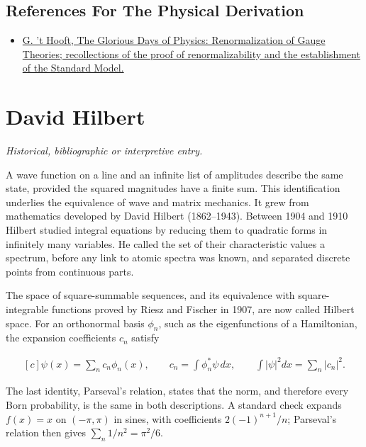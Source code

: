 \documentclass[11pt,oneside]{book}
\newenvironment{centeredalign}{\[\begin{gathered}[c]}{\end{gathered}\]}
\begin{document}
\subsection*{References For The Physical Derivation}
\begin{itemize}
\item \href{https://arxiv.org/abs/hep-th/9812203}{G. 't Hooft, The Glorious Days of Physics: Renormalization of Gauge Theories; recollections of the proof of renormalizability and the establishment of the Standard Model.}
\end{itemize}





\clearpage

\section{David Hilbert}

\label{topic:david-hilbert}

\par\smallskip\noindent\textit{Historical, bibliographic or interpretive entry.}

A wave function on a line and an infinite list of amplitudes describe the same state, provided the squared magnitudes have a finite sum. This identification underlies the equivalence of wave and matrix mechanics. It grew from mathematics developed by David Hilbert (1862--1943). Between 1904 and 1910 Hilbert studied integral equations by reducing them to quadratic forms in infinitely many variables. He called the set of their characteristic values a spectrum, before any link to atomic spectra was known, and separated discrete points from continuous parts.

The space of square-summable sequences, and its equivalence with square-integrable functions proved by Riesz and Fischer in 1907, are now called Hilbert space. For an orthonormal basis \(\phi_n\), such as the eigenfunctions of a Hamiltonian, the expansion coefficients \(c_n\) satisfy

\begin{centeredalign}
\psi(x)=\sum_nc_n\phi_n(x),\qquad c_n=\int\phi_n^*\psi\,dx,\qquad
\int|\psi|^2dx=\sum_n|c_n|^2 .
\end{centeredalign}

The last identity, Parseval's relation, states that the norm, and therefore every Born probability, is the same in both descriptions. A standard check expands \(f(x)=x\) on \((-\pi,\pi)\) in sines, with coefficients \(2(-1)^{n+1}/n\); Parseval's relation then gives \(\sum_n1/n^2=\pi^2/6\).
\end{document}
